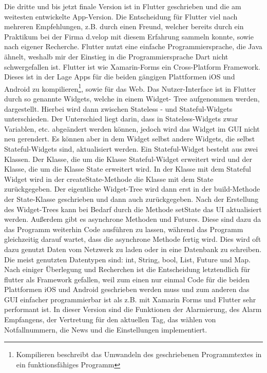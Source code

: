     Die dritte und bis jetzt finale Version ist in Flutter geschrieben und die am weitesten 
    entwickelte App-Version. Die Entscheidung für Flutter viel nach mehreren Empfehlungen, 
    z.B. durch einen Freund, welcher bereits durch ein Praktikum bei der Firma d.velop mit 
    diesem Erfahrung sammeln konnte, sowie nach eigener Recherche. Flutter nutzt eine 
    einfache Programmiersprache, die Java ähnelt, weshalb mir der Einstieg in die 
    Programmiersprache Dart\cite{Dart} nicht schwergefallen ist. Flutter ist wie Xamarin-Forms
    ein Cross-Platform Framework. Dieses ist in der Lage Apps für die beiden gängigen 
    Plattformen iOS und Android zu kompilieren\footnote{Kompilieren beschreibt das Umwandeln
    des geschriebenen Programmtextes in ein funktionsfähiges Programm}, sowie für das Web.
    Das Nutzer-Interface ist in Flutter durch so genannte Widgets, welche in einem Widget-
    Tree aufgenommen werden, dargestellt. Hierbei wird dann zwischen \glqq Stateless\grqq
    \cite{Stateless-Widget}- und \glqq Stateful\grqq\cite{Stateful-Widget}-Widgets unterschieden. 
    Der Unterschied liegt darin, dass in \glqq Stateless-Widgets\grqq{} zwar Variablen, etc. abgeändert 
    werden können, jedoch wird das Widget im GUI nicht neu gerendert. Es können aber in dem 
    Widget selbst andere Widgets, die selbst \glqq Stateful-Widgets\grqq{} sind, aktualisiert werden.
    Ein Stateful-Widget besteht aus zwei Klassen. Der Klasse, die um die Klasse 
    \glqq Stateful-Widget\grqq{} erweitert wird und der Klasse, die um die Klasse 
    \glqq State\grqq{}\cite{State} erweitert wird. In der Klasse mit dem Stateful Widget wird in der
    \glqq createState\grqq{}-Methode die Klasse mit dem State zurückgegeben. Der eigentliche Widget-Tree
    wird dann erst in der \glqq build-Methode\grqq{} der State-Klasse geschrieben und dann auch 
    zurückgegeben. Nach der Erstellung des Widget-Trees kann bei Bedarf durch die Methode 
    \glqq setState\grqq{} das UI aktualisiert werden. Außerdem gibt es asynchrone Methoden und 
    Futures\cite{Futures}. Diese sind dazu da das Programm weiterhin Code ausführen zu lassen,
    während das Programm gleichzeitig darauf wartet, dass die asynchrone Methode fertig wird. 
    Dies wird oft dazu genutzt Daten vom Netzwerk zu laden oder in eine Datenbank zu 
    schreiben. Die meist genutzten Datentypen sind: int, String, bool, List, Future und Map.
    Nach einiger Überlegung und Recherchen ist die Entscheidung letztendlich für flutter als 
    Framework gefallen, weil zum einen nur einmal Code für die beiden Plattformen iOS und 
    Android geschrieben werden muss und zum anderen das GUI einfacher programmierbar ist als 
    z.B. mit Xamarin Forms und Flutter sehr performant ist. In dieser Version sind die Funktionen
    der Alarmierung, des Alarm Empfangens, der Vertretung für den aktuellen Tag, das wählen von 
    Notfallnummern, die News und die Einstellungen implementiert.